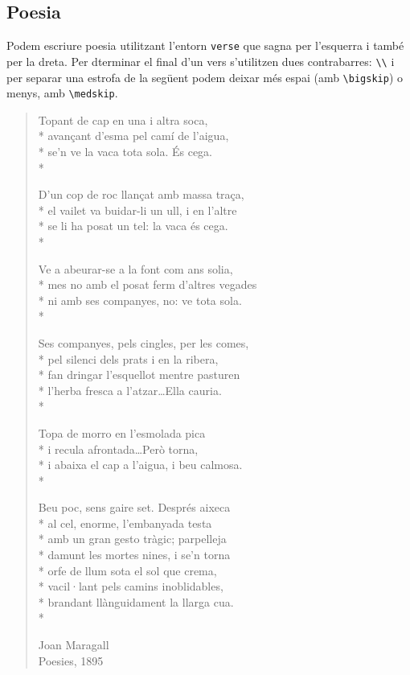 \documentclass[a4paper,
                             twoside,
                             BCOR1.0cm,
                             DIV11,
                             parskip=full,
                             11pt]{scrbook}
\begin{document}
\subsection{Poesia}\label{sbsec:poesia}

Podem escriure poesia utilitzant l'entorn \verb+verse+ que sagna per l'esquerra i també per la dreta. Per dterminar el final d'un vers s'utilitzen dues contrabarres: \verb+\\+ i per separar una estrofa de la següent podem deixar més espai (amb \verb+\bigskip+) o menys, amb  \verb+\medskip+.


\begin{verse}

Topant de cap en una i altra soca,\\*
avançant d'esma pel camí de l'aigua,\\*
se'n ve la vaca tota sola. És cega.\\*
\medskip

D'un cop de roc llançat amb massa traça,\\*
el vailet va buidar-li un ull, i en l'altre\\*
se li ha posat un tel: la vaca és cega.\\*
\medskip

Ve a abeurar-se a la font com ans solia,\\*
mes no amb el posat ferm d'altres vegades\\*
ni amb ses companyes, no: ve tota sola.\\*
\medskip

Ses companyes, pels cingles, per les comes,\\*
pel silenci dels prats i en la ribera,\\*
fan dringar l'esquellot mentre pasturen\\*
l'herba fresca a l'atzar\dots Ella cauria.\\*
\medskip

Topa de morro en l'esmolada pica\\*
i recula afrontada\dots Però torna,\\*
i abaixa el cap a l'aigua, i beu calmosa.\\*
\medskip

Beu poc, sens gaire set. Després aixeca\\*
al cel, enorme, l'embanyada testa\\*
amb un gran gesto tràgic; parpelleja\\*
damunt les mortes nines, i se'n torna\\*
orfe de llum sota el sol que crema,\\*
vacil·lant pels camins inoblidables,\\*
brandant llànguidament la llarga cua.\\*
\medskip
\begin{flushright}
Joan Maragall\\
Poesies, 1895\\
\end{flushright}
\end{verse}
\end{document}
